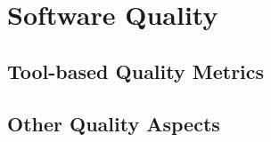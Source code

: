 \section{Software Quality}


\subsection{Tool-based Quality Metrics}

\subsection{Other Quality Aspects}

\cite{Behnamghader_ESEM}